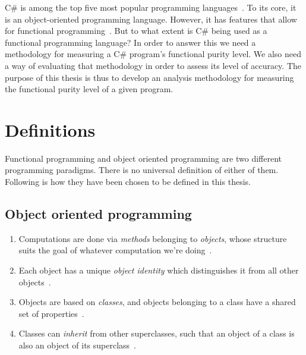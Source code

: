 \documentclass[a4paper,12pt]{article}
\begin{document}
C\# is among the top five most popular programming languages~\cite{tiobe}. To its core, it is an object-oriented programming language. However, it has features that allow for functional programming~\cite{hamid-mosalla}. But to what extent is C\# being used as a functional programming language?
In order to answer this we need a methodology for measuring a C\# program's functional purity level. We also need a way of evaluating that methodology in order to assess its level of accuracy.
The purpose of this thesis is thus to develop an analysis methodology for measuring the functional purity level of a given program.


\section{Definitions} \label{sub:definitions}

Functional programming and object oriented programming are two different programming paradigms. There is no universal definition of either of them. Following is how they have been chosen to be defined in this thesis.

\subsection{Object oriented programming} \label{ssub:object-oriented-programming} %

\begin{enumerate}
\item Computations are done via \textit{methods} belonging to \textit{objects}, whose structure suits the goal of whatever computation we're doing~\cite{john-m-chambers}.
\item Each object has a unique \textit{object identity} which distinguishes it from all other objects~\cite{khoshafian1986object}.
\item Objects are based on \emph{classes}, and objects belonging to a class have a shared set of properties~\cite{john-m-chambers}.
\item Classes can \emph{inherit} from other superclasses, such that an object of a class is also an object of its superclass~\cite{john-m-chambers}.
\end{enumerate}
\end{document}
